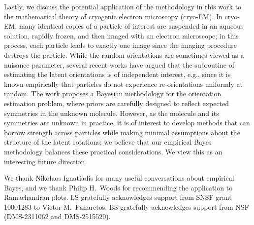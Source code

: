 \documentclass[preprint]{imsart}
\theoremstyle{plain}
\theoremstyle{definition}
\begin{document}
Lastly, we discuss the potential application of the methodology in this work to the mathematical theory of cryogenic electron microscopy (cryo-EM).
In cryo-EM, many identical copies of a particle of interest are suspended in an aqueous solution, rapidly frozen, and then imaged with an electron microscope; in this process, each particle leads to exactly one image since the imaging procedure destroys the particle.
While the random orientations are sometimes viewed as a nuisance parameter, several recent works \cite{Harpaz_Shkolnisky_2023, Mendez, BayesianOrientationCryoEM} have argued that the subroutine of estimating the latent orientations is of independent interest, e.g., since it is known empirically that particles do not experience re-orientations uniformly at random.
The work \cite{BayesianOrientationCryoEM} proposes a Bayesian methodology for the orientation estimation problem, where priors are carefully designed to reflect expected symmetries in the unknown molecule.
However, as the molecule and its symmetries are unknown in practice, it is of interest to develop methods that can borrow strength across particles while making minimal assumptions about the structure of the latent rotations; we believe that our empirical Bayes methodology balances these practical considerations.
We view this as an interesting future direction.

\begin{acks}[Acknowledgments]
We thank Nikolaos Ignatiadis for many useful conversations about empirical Bayes, and we thank Philip H.~Woods for recommending the application to Ramachandran plots.
LS gratefully acknowledges support from SNSF grant 10001283 to Victor M.~Panaretos.
BS gratefully acknowledges support from NSF (DMS-2311062 and DMS-2515520).
\end{acks}


\end{document}
